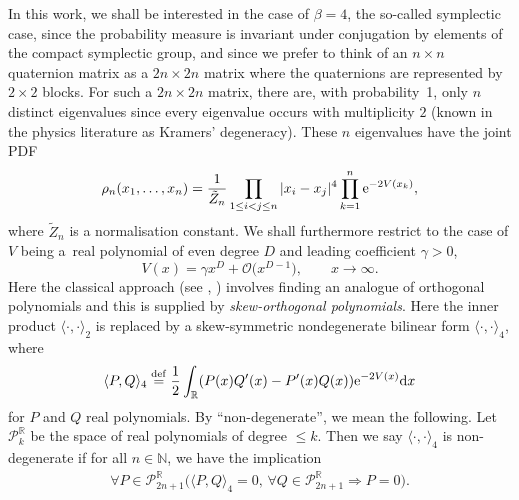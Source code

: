 In this work, we shall be interested in the case of $\beta = 4$, the so-called symplectic case, since the probability measure is invariant under conjugation by elements of the compact symplectic group, and since we prefer to think of an $n\times n$ quaternion matrix as a $2n \times 2n$ matrix where the quaternions are represented by $2 \times 2$ blocks. For such a $2n \times 2n$ matrix, there are, with probability~1, only $n$ distinct eigenvalues since every eigenvalue occurs with multiplicity $2$ (known in the physics literature as Kramers' degeneracy). These $n$ eigenvalues have the joint PDF
\begin{align}\label{pointprocess}
\rho_n(x_1, \dots, x_n) = \frac{1}{\tilde{Z}_n} \prod_{1 \leq i < j \leq n}|x_i - x_j|^4 \prod_{k=1}^{n} {\rm e}^{-2V(x_k)},
\end{align}
where $\tilde{Z}_n $ is a normalisation constant. We shall furthermore restrict to the case of $V$ being a~real polynomial of even degree $D$ and leading coefficient $\gamma > 0$,
\[
V(x) = \gamma x^D + \mathcal{O}\big(x^{D-1}\big),\qquad x \to \infty.
\]
Here the classical approach (see \cite[Chapter 5]{mehta}, \cite[Chapter 6]{loggases}) involves finding an analogue of orthogonal polynomials and this is supplied by \textit{skew-orthogonal polynomials}. Here the inner product $\langle \cdot, \cdot \rangle_2$ is replaced by a skew-symmetric nondegenerate bilinear form $\langle \cdot, \cdot \rangle_4$, where
\begin{equation}\label{skewprod}
\langle P, Q \rangle_4 \overset{\mathrm{def}}{=} \frac{1}{2} \int_{\mathbb{R}} ( P(x) Q^\prime(x)-P^\prime(x) Q(x) ) {\rm e}^{-2V(x)} {\rm d}x
\end{equation}
for $P$ and $Q$ real polynomials. By \enquote{non-degenerate}, we mean the following. Let $\mathscr{P}_k^\mathbb{R}$ be the space of real polynomials of degree $\leq k$. Then we say $\langle \cdot, \cdot \rangle_4$ is non-degenerate if for all $n \in \mathbb{N}$, we have the implication
\begin{align*}
\forall P \in \mathscr{P}_{2n+1}^\mathbb{R} \big( \langle P, Q \rangle_4 = 0,\, \forall Q \in \mathscr{P}_{2n+1}^\mathbb{R} \Longrightarrow P = 0\big).
\end{align*}

